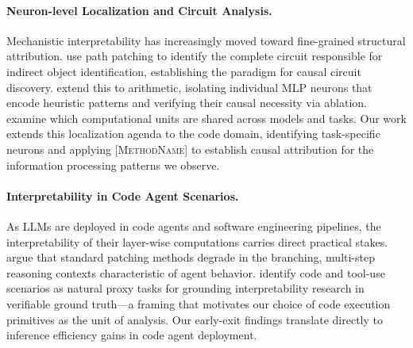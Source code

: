 \paragraph{Neuron-level Localization and Circuit Analysis.}
Mechanistic interpretability has increasingly moved toward fine-grained structural attribution.
\citet{wang2022ioi} use path patching to identify the complete circuit responsible for indirect object identification, establishing the paradigm for causal circuit discovery.
\citet{nikankin2025arithmetic} extend this to arithmetic, isolating individual MLP neurons that encode heuristic patterns and verifying their causal necessity via ablation.
\citet{universalneurons2024} examine which computational units are shared across models and tasks.
Our work extends this localization agenda to the code domain, identifying task-specific neurons and applying \textsc{[MethodName]} to establish causal attribution for the information processing patterns we observe.

\paragraph{Interpretability in Code Agent Scenarios.}
As LLMs are deployed in code agents and software engineering pipelines, the interpretability of their layer-wise computations carries direct practical stakes.
\citet{nanda2025resampling} argue that standard patching methods degrade in the branching, multi-step reasoning contexts characteristic of agent behavior.
\citet{nanda2025pragmatic} identify code and tool-use scenarios as natural proxy tasks for grounding interpretability research in verifiable ground truth---a framing that motivates our choice of code execution primitives as the unit of analysis.
Our early-exit findings translate directly to inference efficiency gains in code agent deployment.
